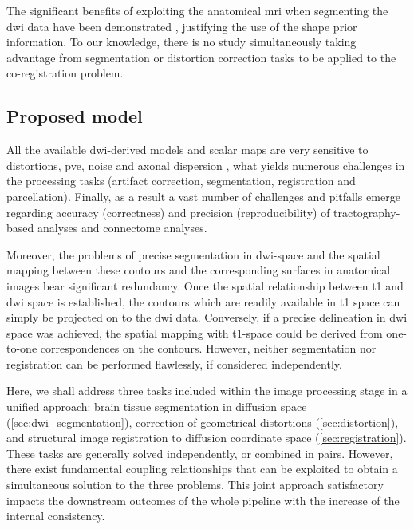 The significant benefits of exploiting the anatomical \gls{mri} when 
segmenting the \gls{dwi} data have been demonstrated \cite{zollei_improved_2010}, 
justifying the use of the shape prior information. To our knowledge, there is
no study simultaneously taking advantage from segmentation or distortion correction
tasks to be applied to the co-registration problem.

\subsection{Proposed model}
\label{sec:contributions}

All the available \gls{dwi}-derived models and scalar maps 
are very sensitive to distortions, \gls{pve}, noise and axonal dispersion 
\citep{jbabdi_tractography:_2011}, what yields numerous challenges in the
processing tasks (artifact correction, segmentation, registration and 
parcellation). Finally, as a result a vast number of challenges and pitfalls 
emerge regarding accuracy (correctness) and precision (reproducibility) of 
tractography-based analyses \citep{jones_white_2013} and connectome
analyses.

Moreover, the problems of precise segmentation in \gls{dwi}-space and the 
spatial mapping between these contours and the corresponding surfaces in 
anatomical images bear significant redundancy. Once the spatial relationship 
between \gls{t1} and \gls{dwi} space is established, the contours which are 
readily available in \gls{t1} space can simply be projected on to the 
\gls{dwi} data. Conversely, if a precise delineation in \gls{dwi} space 
was achieved, the spatial mapping with \gls{t1}-space could be derived 
from one-to-one correspondences on the contours. However, neither segmentation 
nor registration can be performed flawlessly, if considered independently.

Here, we shall address three tasks included within  the image processing stage in 
a unified approach: brain tissue segmentation in diffusion space 
(\autoref{sec:dwi_segmentation}), 
correction of geometrical distortions (\autoref{sec:distortion}), and structural 
image registration to diffusion coordinate space (\autoref{sec:registration}). 
These tasks are generally
solved independently, or combined in pairs. However, there exist fundamental 
coupling relationships that can be exploited to obtain a simultaneous solution to 
the three problems. This joint approach satisfactory impacts the downstream
outcomes of the whole pipeline with the increase of the internal consistency.

